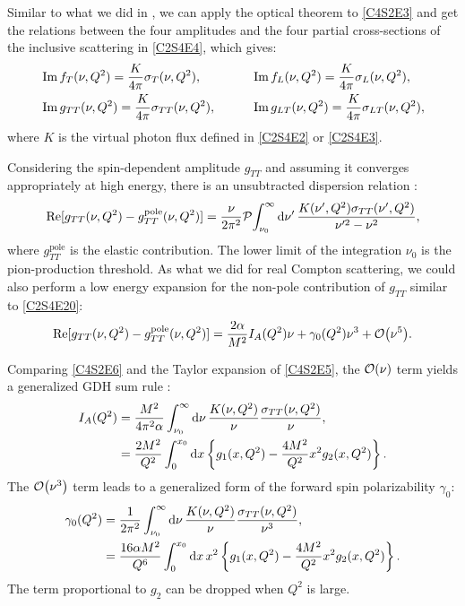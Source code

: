 Similar to what we did in , we can apply the optical theorem to \cref{C4S2E3} and get the relations between the four amplitudes and the four partial cross-sections of the inclusive scattering in \cref{C2S4E4}, which gives:
\begin{equation} \label{C4S2E4}
\begin{aligned}
& \Im f_T(\nu,Q^2) = \frac{K}{4\pi}\sigma_T(\nu,Q^2), & \qquad & \Im f_L(\nu,Q^2) = \frac{K}{4\pi}\sigma_L(\nu,Q^2), \\
& \Im g_{TT}(\nu,Q^2) = \frac{K}{4\pi}\sigma_{TT}(\nu,Q^2), & \qquad & \Im g_{LT}(\nu,Q^2) = \frac{K}{4\pi}\sigma_{LT}(\nu,Q^2),
\end{aligned}
\end{equation}
where $K$ is the virtual photon flux defined in \cref{C2S4E2} or \cref{C2S4E3}.

Considering the spin-dependent amplitude $g_{TT}$ and assuming it converges appropriately at high energy, there is an unsubtracted dispersion relation \cite{Drechsel2003}:
\begin{equation} \label{C4S2E5}
\Re[g_{TT}(\nu,Q^2)-g_{TT}^{\mathrm{pole}}(\nu,Q^2)] = \frac{\nu}{2\pi^2}\pv{\int_{\nu_0}^\infty\dd{\nu'}\frac{K(\nu',Q^2)\stt(\nu',Q^2)}{\nu'^2-\nu^2}},
\end{equation}
where $g_{TT}^{\mathrm{pole}}$ is the elastic contribution. The lower limit of the integration $\nu_0$ is the pion-production threshold. As what we did for real Compton scattering, we could also perform a low energy expansion for the non-pole contribution of $g_{TT}$ similar to \cref{C2S4E20}:
\begin{equation} \label{C4S2E6}
\Re[g_{TT}(\nu,Q^2)-g_{TT}^{\mathrm{pole}}(\nu,Q^2)] = \frac{2\alpha}{M^2}I_A(Q^2)\nu+\gamma_0(Q^2)\nu^3+\order{\nu^5}.
\end{equation}

Comparing \cref{C4S2E6} and the Taylor expansion of \cref{C4S2E5}, the $\order{\nu}$ term yields a generalized GDH sum rule \cite{Drechsel2001}:
\begin{equation} \label{C4S2E7}
\begin{split}
I_A(Q^2) & = \frac{M^2}{4\pi^2\alpha}\int_{\nu_0}^\infty\dd{\nu}\frac{K(\nu,Q^2)}{\nu}\frac{\sigma_{TT}(\nu,Q^2)}{\nu}, \\
& = \frac{2M^2}{Q^2}\int_0^{x_0}\dd{x}\left\{g_1(x,Q^2)-\frac{4M^2}{Q^2}x^2g_2(x,Q^2)\right\}.
\end{split}
\end{equation}
The $\order{\nu^3}$ term leads to a generalized form of the forward spin polarizability $\gamma_0$:
\begin{equation} \label{C4S2E8}
\begin{split}
\gamma_0(Q^2) & = \frac{1}{2\pi^2}\int_{\nu_0}^\infty\dd{\nu}\frac{K(\nu,Q^2)}{\nu}\frac{\sigma_{TT}(\nu,Q^2)}{\nu^3}, \\
& = \frac{16\alpha M^2}{Q^6}\int_0^{x_0}\dd{x}x^2\left\{g_1(x,Q^2)-\frac{4M^2}{Q^2}x^2g_2(x,Q^2)\right\}.
\end{split}
\end{equation}
The term proportional to $g_2$ can be dropped when $Q^2$ is large.

